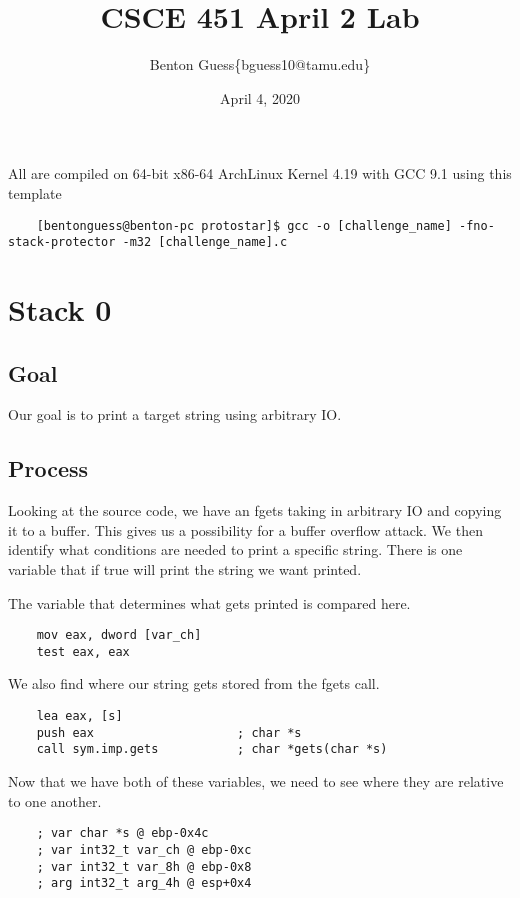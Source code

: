 \documentclass[11pt]{article}
\title{CSCE 451 April 2 Lab}
\author{Benton Guess\{bguess10@tamu.edu\}}
\date{April 4, 2020}
\begin{document}
\maketitle

All are compiled on 64-bit x86-64 ArchLinux Kernel 4.19 with GCC 9.1 using this template
\begin{lstlisting}
    [bentonguess@benton-pc protostar]$ gcc -o [challenge_name] -fno-stack-protector -m32 [challenge_name].c 
\end{lstlisting}


\section*{Stack 0}
\subsection*{Goal}
Our goal is to print a target string using arbitrary IO.

\subsection*{Process}
Looking at the source code, we have an fgets taking in arbitrary IO and copying it to a buffer. This gives us a possibility for a buffer overflow attack. We then identify what conditions are needed to print a specific string. There is one variable that if true will print the string we want printed.

The variable that determines what gets printed is compared here.
\begin{lstlisting}
    mov eax, dword [var_ch]
    test eax, eax
\end{lstlisting}

We also find where our string gets stored from the fgets call.
\begin{lstlisting}
    lea eax, [s]
    push eax                    ; char *s
    call sym.imp.gets           ; char *gets(char *s)
\end{lstlisting}

Now that we have both of these variables, we need to see where they are relative to one another.
\begin{lstlisting}
    ; var char *s @ ebp-0x4c
    ; var int32_t var_ch @ ebp-0xc
    ; var int32_t var_8h @ ebp-0x8
    ; arg int32_t arg_4h @ esp+0x4
\end{lstlisting}
\end{document}
